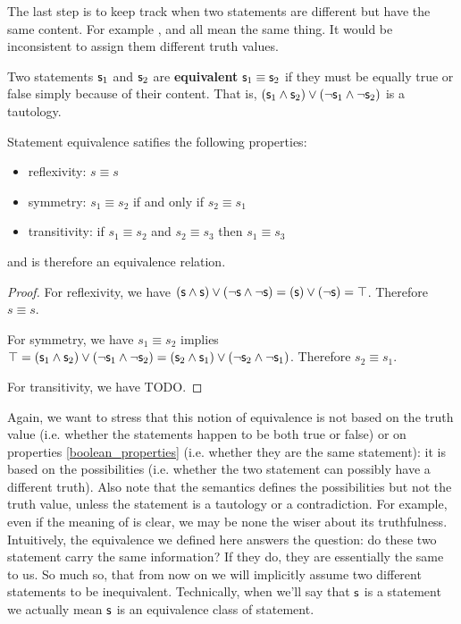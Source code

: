 \documentclass[11pt,letterpaper,fleqn]{memoir} %
\begin{document}
The last step is to keep track when two statements are different but have the same content. For example ,  and  all mean the same thing. It would be inconsistent to assign them different truth values.

\begin{mathSection}

\begin{defn}
	Two statements $\mathsf{s}_1$ and $\mathsf{s}_2$ are \textbf{equivalent} $\mathsf{s}_1 \equiv \mathsf{s}_2$ if they must be equally true or false simply because of their content. That is, $(\mathsf{s}_1 \wedge \mathsf{s}_2) \vee (\neg\mathsf{s}_1 \wedge \neg\mathsf{s}_2)$ is a tautology.
\end{defn}

\begin{prop}
	Statement equivalence satifies the following properties:
	\begin{itemize}
		\item reflexivity: $s \equiv s$
		\item symmetry: $s_1 \equiv s_2$ if and only if $s_2 \equiv s_1$
		\item transitivity: if $s_1 \equiv s_2$ and $s_2 \equiv s_3$ then $s_1 \equiv s_3$
	\end{itemize}
	and is therefore an equivalence relation.
\end{prop}
\begin{proof}
	For reflexivity, we have $(\mathsf{s} \wedge \mathsf{s}) \vee (\neg\mathsf{s} \wedge \neg\mathsf{s}) = (\mathsf{s}) \vee (\neg\mathsf{s}) = \top$. Therefore $s \equiv s$.
	
	For symmetry, we have $s_1 \equiv s_2$ implies $\top = (\mathsf{s}_1 \wedge \mathsf{s}_2) \vee (\neg\mathsf{s}_1 \wedge \neg\mathsf{s}_2) = (\mathsf{s}_2 \wedge \mathsf{s}_1) \vee (\neg\mathsf{s}_2 \wedge \neg\mathsf{s}_1)$. Therefore $s_2 \equiv s_1$.
	
	For transitivity, we have TODO.
\end{proof}

\end{mathSection}

Again, we want to stress that this notion of equivalence is not based on the truth value (i.e. whether the statements happen to be both true or false) or on properties \ref{boolean_properties} (i.e. whether they are the same statement): it is based on the possibilities (i.e. whether the two statement can possibly have a different truth). Also note that the semantics defines the possibilities but not the truth value, unless the statement is a tautology or a contradiction. For example, even if the meaning of  is clear, we may be none the wiser about its truthfulness. Intuitively, the equivalence we defined here answers the question: do these two statement carry the same information? If they do, they are essentially the same to us. So much so, that from now on we will implicitly assume two different statements to be inequivalent. Technically, when we'll say that $\mathsf{s}$ is a statement we actually mean $\mathsf{s}$ is an equivalence class of statement.
\end{document}
